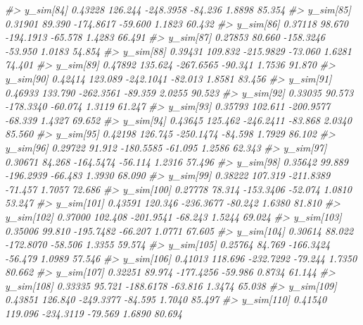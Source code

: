\documentclass[
  10pt,
  italian,
  a4paper,
  extrafontsizes,onecolumn,openright
  ]{memoir}
\newenvironment{Shaded}{\begin{snugshade}}{\end{snugshade}}
\newcommand{\CommentTok}[1]{\textcolor[rgb]{0.56,0.35,0.01}{\textit{#1}}}
\begin{document}
\begin{Shaded}
\begin{Highlighting}[]
\CommentTok{\#\textgreater{}   y\_sim[84]   0.43228 126.244 {-}248.3958 {-}84.236  1.8898 85.354}
\CommentTok{\#\textgreater{}   y\_sim[85]   0.31901  89.390 {-}174.8617 {-}59.600  1.1823 60.432}
\CommentTok{\#\textgreater{}   y\_sim[86]   0.37118  98.670 {-}194.1913 {-}65.578  1.4283 66.491}
\CommentTok{\#\textgreater{}   y\_sim[87]   0.27853  80.660 {-}158.3246 {-}53.950  1.0183 54.854}
\CommentTok{\#\textgreater{}   y\_sim[88]   0.39431 109.832 {-}215.9829 {-}73.060  1.6281 74.401}
\CommentTok{\#\textgreater{}   y\_sim[89]   0.47892 135.624 {-}267.6565 {-}90.341  1.7536 91.870}
\CommentTok{\#\textgreater{}   y\_sim[90]   0.42414 123.089 {-}242.1041 {-}82.013  1.8581 83.456}
\CommentTok{\#\textgreater{}   y\_sim[91]   0.46933 133.790 {-}262.3561 {-}89.359  2.0255 90.523}
\CommentTok{\#\textgreater{}   y\_sim[92]   0.33035  90.573 {-}178.3340 {-}60.074  1.3119 61.247}
\CommentTok{\#\textgreater{}   y\_sim[93]   0.35793 102.611 {-}200.9577 {-}68.339  1.4327 69.652}
\CommentTok{\#\textgreater{}   y\_sim[94]   0.43645 125.462 {-}246.2411 {-}83.868  2.0340 85.560}
\CommentTok{\#\textgreater{}   y\_sim[95]   0.42198 126.745 {-}250.1474 {-}84.598  1.7929 86.102}
\CommentTok{\#\textgreater{}   y\_sim[96]   0.29722  91.912 {-}180.5585 {-}61.095  1.2586 62.343}
\CommentTok{\#\textgreater{}   y\_sim[97]   0.30671  84.268 {-}164.5474 {-}56.114  1.2316 57.496}
\CommentTok{\#\textgreater{}   y\_sim[98]   0.35642  99.889 {-}196.2939 {-}66.483  1.3930 68.090}
\CommentTok{\#\textgreater{}   y\_sim[99]   0.38222 107.319 {-}211.8389 {-}71.457  1.7057 72.686}
\CommentTok{\#\textgreater{}   y\_sim[100]  0.27778  78.314 {-}153.3406 {-}52.074  1.0810 53.247}
\CommentTok{\#\textgreater{}   y\_sim[101]  0.43591 120.346 {-}236.3677 {-}80.242  1.6380 81.810}
\CommentTok{\#\textgreater{}   y\_sim[102]  0.37000 102.408 {-}201.9541 {-}68.243  1.5244 69.024}
\CommentTok{\#\textgreater{}   y\_sim[103]  0.35006  99.810 {-}195.7482 {-}66.207  1.0771 67.605}
\CommentTok{\#\textgreater{}   y\_sim[104]  0.30614  88.022 {-}172.8070 {-}58.506  1.3355 59.574}
\CommentTok{\#\textgreater{}   y\_sim[105]  0.25764  84.769 {-}166.3424 {-}56.479  1.0989 57.546}
\CommentTok{\#\textgreater{}   y\_sim[106]  0.41013 118.696 {-}232.7292 {-}79.244  1.7350 80.662}
\CommentTok{\#\textgreater{}   y\_sim[107]  0.32251  89.974 {-}177.4256 {-}59.986  0.8734 61.144}
\CommentTok{\#\textgreater{}   y\_sim[108]  0.33335  95.721 {-}188.6178 {-}63.816  1.3474 65.038}
\CommentTok{\#\textgreater{}   y\_sim[109]  0.43851 126.840 {-}249.3377 {-}84.595  1.7040 85.497}
\CommentTok{\#\textgreater{}   y\_sim[110]  0.41540 119.096 {-}234.3119 {-}79.569  1.6890 80.694}

\end{Highlighting}
\end{Shaded}
\end{document}
